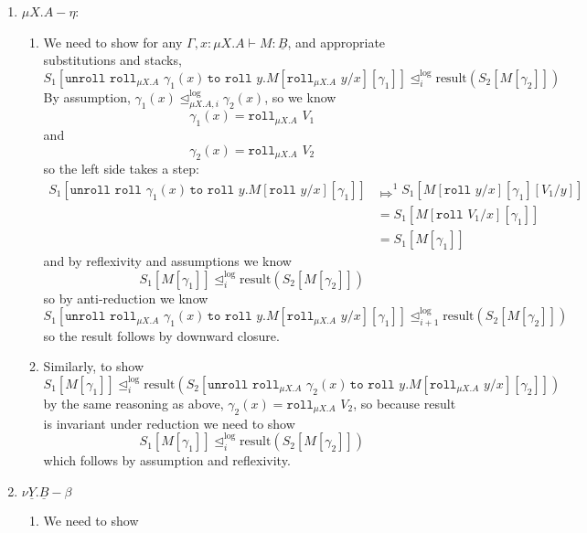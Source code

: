\documentclass[acmsmall,screen,12pt]{acmart}
\renewcommand{\u}{\underline}
\newcommand{\apreorder}{\trianglelefteq}
\newcommand{\itylrof}[3]{\ilrof{#1}{#3,#2}}
\newcommand{\ilrof}[2]{\mathrel{{#1}^{\text{log}}_{#2}}}
\newcommand{\itylr}[2]{\itylrof{\apreorder}{#1}{#2}}
\newcommand{\ilr}[1]{\ilrof{\apreorder}{#1}}
\newcommand{\bigstepsin}[1]{\mathrel{\Mapsto^{#1}}}
\newcommand{\roll}{\kw{roll}}
\newcommand{\rollty}[1]{\texttt{roll}_{#1}\,\,}
\newcommand{\result}{\text{result}}
\newcommand{\kw}[1]{\texttt{#1}\,\,}
\newcommand{\pmmuXtoYinZ}[3]{\kw{unroll} #1 \,\kw{to} \roll #2. #3}
\begin{document}
{\begin{longproof}
\begin{enumerate}
\begin{enumerate}
    \item For the other direction we need to show
      \[ S_1[M[\gamma_1,V[\gamma_1]/x]] \ilr i \result(S_2[\pmmuXtoYinZ {\rollty{\mu X.A} V[\gamma_2]} x M[\gamma_2]]) \]
      Since results are invariant under steps, this is the same as
      \[ S_1[M[\gamma_1,V[\gamma_1]/x]] \ilr i \result(S_2[M[\gamma_2,V[\gamma_2/x]]]) \]
      which follows by reflexivity and assumptions about the stacks
      and substitutions.
    \end{enumerate}
  \item $\mu X.A-\eta$:
    \begin{enumerate}
    \item We need to show for any $\Gamma, x : \mu X. A \vdash M : \u B$,
      and appropriate substitutions and stacks,
      \[ S_1[\pmmuXtoYinZ {\rollty{\mu X.A} {\gamma_1(x)}} {y}  M[\rollty{\mu X.A}y/x][\gamma_1]] \ilr i \result(S_2[M[\gamma_2]]) \]
      By assumption, $\gamma_1(x) \itylr i {\mu X.A} \gamma_2(x)$, so we know
      \[ \gamma_1(x) = \rollty{\mu X.A} V_1 \]
      and
      \[ \gamma_2(x) = \rollty{\mu X.A} V_2 \]
      so the left side takes a step:
      \begin{align*}
        S_1[\pmmuXtoYinZ {\roll {\gamma_1(x)}} {y}  M[\roll y/x][\gamma_1]]
        &\bigstepsin{1} S_1[M[\roll y/x][\gamma_1][V_1/y]]\\
        &= S_1[M[\roll V_1/x][\gamma_1]]\\
        & = S_1[M[\gamma_1]]
      \end{align*}
      and by reflexivity and assumptions we know
      \[ S_1[M[\gamma_1]] \ilr {i} \result(S_2[M[\gamma_2]]) \]
      so by anti-reduction we know 
      \[ S_1[\pmmuXtoYinZ {\rollty{\mu X.A} {\gamma_1(x)}} {y}  M[\rollty{\mu X.A}y/x][\gamma_1]] \ilr {i+1} \result(S_2[M[\gamma_2]]) \]
      so the result follows by downward closure.
    \item Similarly, to show
      \[ S_1[M[\gamma_1]] \ilr i \result(S_2[\pmmuXtoYinZ {\rollty{\mu X.A} {\gamma_2(x)}} {y}  M[\rollty{\mu X.A}y/x][\gamma_2]]) \]
      by the same reasoning as above, $\gamma_2(x) = \rollty{\mu X.A}V_2$, so because result is invariant under reduction we need to show
      \[ S_1[M[\gamma_1]] \ilr i \result(S_2[M[\gamma_2]]) \]
      which follows by assumption and reflexivity.
    \end{enumerate}
  \item $\nu \u Y. \u B-\beta$
    \begin{enumerate}
    \item We need to show

\end{enumerate}
\end{enumerate}
\end{longproof}}
\end{document}
